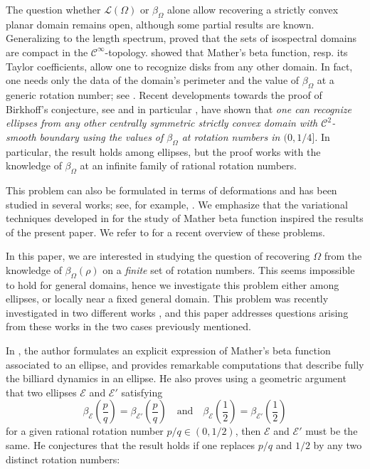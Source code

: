 \documentclass[a4paper]{article}
\theoremstyle{definition}
\begin{document}
The question whether $\mathscr L(\Omega)$ or $\beta_{\Omega}$ alone allow recovering a strictly convex planar domain remains open, although some partial results are known. 
Generalizing \cite{MelroseIsospectral, OsgoodPhillipsSarnak1, OsgoodPhillipsSarnak2, OsgoodPhillipsSarnak3} to the length spectrum, \cite{Vig} proved that the sets of isospectral domains are compact in the $\mathscr C^{\infty}$-topology.
\cite{Siburg, SorDCDS} showed that Mather's beta function, resp. its Taylor coefficients, allow one to recognize disks from any other domain. In fact, one needs only the data of the domain's perimeter and the value of $\beta_{\Omega}$ at a generic rotation number; see \cite{BBS}. 
Recent developments towards the proof of Birkhoff's conjecture, see \cite{BialyMironov, KS} and in particular \cite[Theorem 2.3]{Bialyellipses}, have shown that \textit{one can recognize ellipses from any other centrally symmetric strictly convex domain with $\mathscr C^2$-smooth boundary using the values of $\beta_{\Omega}$ at rotation numbers in $(0,1/4]$.} In particular, the result holds among ellipses, but the proof works with the knowledge of $\beta_{\Omega}$ at an infinite family of rational rotation numbers. 

This problem can also be formulated in terms of deformations and has been studied in several works; see, for example, \cite{DKW, FKS_ellipse, HezariZelditch, HZ2}. We emphasize that the variational techniques developed in \cite{FKS_ellipse} for the study of Mather beta function inspired the results of the present paper. We refer to \cite{FKS_lecturenotes} for a recent overview of these problems.
\vspace{0.2cm}

In this paper, we are interested in studying the question of recovering $\Omega$ from the knowledge of $\beta_{\Omega}(\rho)$ on a \textit{finite} set of rotation numbers. This seems impossible to hold for general domains, hence we investigate this problem either among ellipses, or locally near a fixed general domain. This problem was recently investigated in two different works \cite{BBS, Bialyellipses}, and this paper addresses questions arising from these works in the two cases previously mentioned.

In \cite{Bialyellipses}, the author formulates an explicit expression of Mather's beta function associated to an ellipse, and provides remarkable computations that describe fully the billiard dynamics in an ellipse. He also proves using a geometric argument that two ellipses $\mathscr E$ and $\mathscr E'$ satisfying
\[
\beta_{\mathscr E}\left(\frac{p}{q}\right) = 
\beta_{\mathscr E'}\left(\frac{p}{q}\right)
\quad\text{and}\quad
\beta_{\mathscr E}\left(\frac{1}{2}\right) = 
\beta_{\mathscr E'}\left(\frac{1}{2}\right)
\]
for a given rational rotation number $p/q\in(0,1/2)$, then $\mathscr E$ and $\mathscr E'$ must be the same. He conjectures that the result holds if one replaces $p/q$ and $1/2$ by any two distinct rotation numbers:
\end{document}
